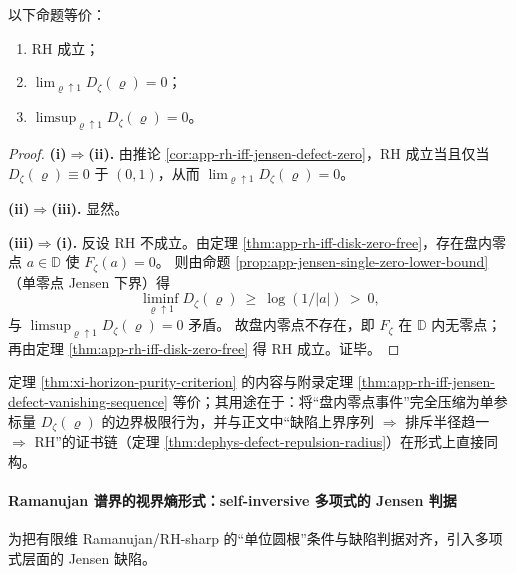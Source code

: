 \begin{theorem}\label{thm:xi-horizon-purity-criterion}
以下命题等价：
\begin{enumerate}
  \item[(i)] RH 成立；
  \item[(ii)] \(\displaystyle \lim_{\varrho\uparrow 1}D_{\zeta}(\varrho)=0\)；
  \item[(iii)] \(\displaystyle \limsup_{\varrho\uparrow 1}D_{\zeta}(\varrho)=0\)。
\end{enumerate}
\end{theorem}

\begin{proof}
\textbf{(i)\(\Rightarrow\)(ii).}
由推论 \ref{cor:app-rh-iff-jensen-defect-zero}，RH 成立当且仅当 \(D_{\zeta}(\varrho)\equiv 0\) 于 \((0,1)\)，从而 \(\lim_{\varrho\uparrow 1}D_{\zeta}(\varrho)=0\)。
\par
\textbf{(ii)\(\Rightarrow\)(iii).}
显然。
\par
\textbf{(iii)\(\Rightarrow\)(i).}
反设 RH 不成立。由定理 \ref{thm:app-rh-iff-disk-zero-free}，存在盘内零点 \(a\in\mathbb{D}\) 使 \(F_{\zeta}(a)=0\)。
则由命题 \ref{prop:app-jensen-single-zero-lower-bound}（单零点 Jensen 下界）得
\[
\liminf_{\varrho\uparrow 1}D_{\zeta}(\varrho)\ \ge\ \log(1/|a|)\ >\ 0,
\]
与 \(\limsup_{\varrho\uparrow 1}D_{\zeta}(\varrho)=0\) 矛盾。
故盘内零点不存在，即 \(F_{\zeta}\) 在 \(\mathbb{D}\) 内无零点；再由定理 \ref{thm:app-rh-iff-disk-zero-free} 得 RH 成立。证毕。
\end{proof}

\begin{remark}[与可审计证书链的对齐]\label{rem:xi-horizon-purity-audit-alignment}
定理 \ref{thm:xi-horizon-purity-criterion} 的内容与附录定理 \ref{thm:app-rh-iff-jensen-defect-vanishing-sequence} 等价；其用途在于：将“盘内零点事件”完全压缩为单参标量 \(D_{\zeta}(\varrho)\) 的边界极限行为，并与正文中“缺陷上界序列 \(\Rightarrow\) 排斥半径趋一 \(\Rightarrow\) RH”的证书链（定理 \ref{thm:dephys-defect-repulsion-radius}）在形式上直接同构。
\end{remark}

\paragraph{Ramanujan 谱界的视界熵形式：self-inversive 多项式的 Jensen 判据}
为把有限维 Ramanujan/RH-sharp 的“单位圆根”条件与缺陷判据对齐，引入多项式层面的 Jensen 缺陷。

